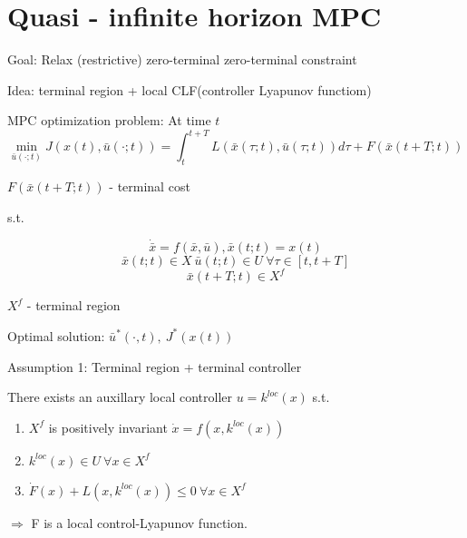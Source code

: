 \section{Quasi - infinite horizon MPC}

Goal: Relax (restrictive) zero-terminal zero-terminal constraint

Idea: terminal region + local CLF(controller Lyapunov functiom)

MPC optimization problem: At time $t$
\begin{equation*}
\min_{\bar u(\cdot;t)} J(x(t),\bar u(\cdot;t)) = \int_t^{t+T}L(\bar x(\tau;t), \bar u(\tau;t))d\tau + F(\bar x(t+T;t)) 
\end{equation*}

$F(\bar x(t+T;t))$ - terminal cost

s.t.

\begin{equation*}
\dot{\bar x} = f(\bar x, \bar u), \bar x(t;t) = x(t)
\end{equation*}
\begin{equation*}
\bar x(t;t) \in X \ \bar u(t;t) \in U \ \forall \tau \in [t,t+T]
\end{equation*}
\begin{equation*}
\bar x(t+T;t) \in X^f
\end{equation*}

$X^f$ - terminal region

Optimal solution: $\bar u^*(\cdot, t), \ J^*(x(t))$

Assumption 1: Terminal region + terminal controller

There exists an auxillary local controller $u = k^{loc}(x)$ s.t.
\begin{enumerate}
\item $X^f$ is positively invariant $\dot x = f(x,k^{loc}(x))$
\item $k^{loc}(x) \in U \ \forall x \in X^f$
\item $\dot F(x) + L(x, k^{loc}(x)) \leq 0 \ \forall x \in X^f$
\end{enumerate}

$\Rightarrow$ F is a local control-Lyapunov function.

